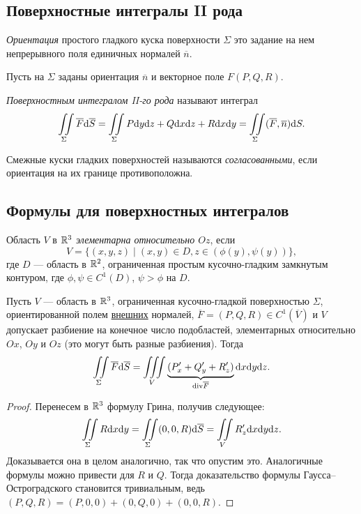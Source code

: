\subsection{Поверхностные интегралы II рода}

\begin{Def}
\textit{Ориентация} простого гладкого куска поверхности $\Sigma$ это
задание на нем непрерывного поля единичных нормалей $\overline n$.
\end{Def}

Пусть на $\Sigma$ заданы ориентация $\overline n$ и векторное поле $F(P, Q, R)$. 

\begin{Def}
\textit{Поверхностным интегралом II-го рода} называют интеграл
$$
\iint\limits_{\Sigma} \overline F \mathrm{d} \overline S = \iint\limits_{\Sigma} P\mathrm{d} y \mathrm{d} z + Q \mathrm{d}x \mathrm{d} z+ R \mathrm{d}x \mathrm{d} y = \iint\limits_{\Sigma} (\overline F, \overline n) \mathrm{d} S.
$$
\end{Def}

\begin{Def}
Смежные куски гладких поверхностей называются \textit{согласованными}, если ориентация на их границе противоположна.
\end{Def}

\subsection{Формулы для поверхностных интегралов}

\begin{Def}
Область $V$ в $\mathbb{R}^3$ \textit{элементарна относительно $Oz$}, если 
$$V = \{ (x, y, z) \mid (x, y) \in D, z \in (\phi(y), \psi(y)) \},$$
 где $D$ --- область в $\mathbb{R}^2$, ограниченная простым кусочно-гладким замкнутым контуром,  где $\phi, \psi \in C^{1}(D)$, $\psi > \phi$ на $D$.
\end{Def}

\begin{Theorem}
Пусть $V$ --- область в $\mathbb{R}^3$, ограниченная кусочно-гладкой поверхностью $\Sigma$, ориентированной полем \underline{внешних} нормалей, $\overline F = (P, Q, R) \in C^1(\overline V)$ и $V$ допускает разбиение на конечное число подобластей, элементарных относительно $Ox$, $Oy$ и $Oz$ (это могут быть разные разбиения). Тогда
$$
\iint\limits_{\Sigma}\overline F \mathrm{d} \overline S = \iiint\limits_V \underbrace{(P'_x + Q'_y + R'_z)}_{\mathrm{div} \overline F}\mathrm{d}x \mathrm{d} y \mathrm{d} z.
$$
\end{Theorem}
\begin{proof}
Перенесем в $\mathbb{R}^3$ формулу Грина, получив следующее:
$$
\iint\limits_{\Sigma} R\mathrm{d}x\mathrm{d} y = \iint\limits_{\Sigma} (0, 0, R)\mathrm{d} \overline S = \iint\limits_V R'_z \mathrm{d} x \mathrm{d} y \mathrm{d} z. 
$$
Доказывается она в целом аналогично, так что опустим это. Аналогичные формулы можно привести для $R$ и $Q$. Тогда доказательство формулы Гаусса--Остроградского становится тривиальным, ведь $(P, Q, R) = (P, 0, 0) + (0, Q, 0) + (0, 0, R)$.
\end{proof}

